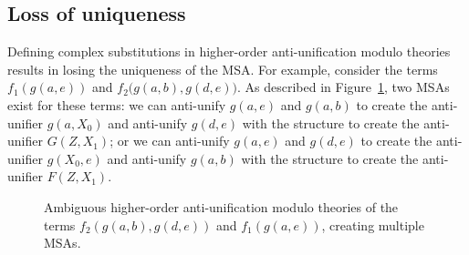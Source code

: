\subsection{Loss of uniqueness}
Defining complex substitutions in higher-order anti-unification modulo theories results in losing the uniqueness of the MSA. For example, consider the terms $f_1(g(a,e))$ and $f_2(g(a,b),$\linebreak$g(d,e))$. As described in Figure~\ref{fig:multipleMSA}, two MSAs exist for these terms: we can anti-unify $g(a,e)$ and $g(a,b)$ to create the anti-unifier $g(a,X_0)$ and anti-unify $g(d,e)$ with the \NIL{} structure to create the anti-unifier $G(Z,X_1)$; or we can anti-unify $g(a,e)$ and $g(d,e)$ to create the anti-unifier $g(X_0,e)$ and anti-unify $g(a,b)$ with the \NIL{} structure to create the anti-unifier $F(Z,X_1)$.

\begin{figure}[t]
\centering{}
\vspace*{1em}

\centering{}
\caption[Ambiguous higher-order anti-unification modulo theories of two terms.]{Ambiguous higher-order anti-unification modulo theories of the terms $f_2(g(a,b), g(d,e))$
and $f_1(g(a,e))$, creating multiple MSAs.}
  \label{fig:multipleMSA}
\end{figure}



